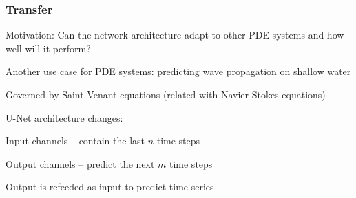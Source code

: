 \begin{frame}
    \frametitle{Transfer}
\vspace*{0.8cm}
Motivation: Can the network architecture adapt to other PDE systems and how well will it perform?

Another use case for PDE systems: predicting wave propagation on shallow water

Governed by Saint-Venant equations (related with Navier-Stokes equations)

U-Net architecture changes:
\begin{PraesentationAufzaehlung}
    \item Input channels -- contain the last $n$ time steps
    \item Output channels -- predict the next $m$ time steps
    \item Output is refeeded as input to predict time series
\end{PraesentationAufzaehlung}

\end{frame}
\clearpage

